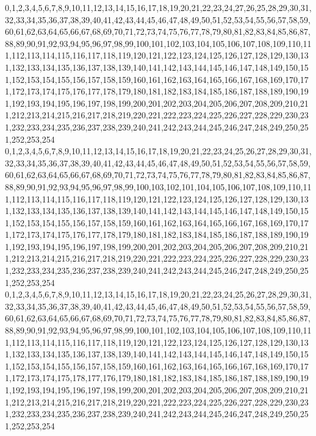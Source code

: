 \documentclass[12pt]{article}
\begin{document}
{0,1,2,3,4,5,6,7,8,9,10,11,12,13,14,15,16,17,18,19,20,21,22,23,24,27,26,25,28,29,30,31,32,33,34,35,36,37,38,39,40,41,42,43,44,45,46,47,48,49,50,51,52,53,54,55,56,57,58,59,60,61,62,63,64,65,66,67,68,69,70,71,72,73,74,75,76,77,78,79,80,81,82,83,84,85,86,87,88,89,90,91,92,93,94,95,96,97,98,99,100,101,102,103,104,105,106,107,108,109,110,111,112,113,114,115,116,117,118,119,120,121,122,123,124,125,126,127,128,129,130,131,132,133,134,135,136,137,138,139,140,141,142,143,144,145,146,147,148,149,150,151,152,153,154,155,156,157,158,159,160,161,162,163,164,165,166,167,168,169,170,171,172,173,174,175,176,177,178,179,180,181,182,183,184,185,186,187,188,189,190,191,192,193,194,195,196,197,198,199,200,201,202,203,204,205,206,207,208,209,210,211,212,213,214,215,216,217,218,219,220,221,222,223,224,225,226,227,228,229,230,231,232,233,234,235,236,237,238,239,240,241,242,243,244,245,246,247,248,249,250,251,252,253,254\\
0,1,2,3,4,5,6,7,8,9,10,11,12,13,14,15,16,17,18,19,20,21,22,23,24,25,26,27,28,29,30,31,32,33,34,35,36,37,38,39,40,41,42,43,44,45,46,47,48,49,50,51,52,53,54,55,56,57,58,59,60,61,62,63,64,65,66,67,68,69,70,71,72,73,74,75,76,77,78,79,80,81,82,83,84,85,86,87,88,89,90,91,92,93,94,95,96,97,98,99,100,103,102,101,104,105,106,107,108,109,110,111,112,113,114,115,116,117,118,119,120,121,122,123,124,125,126,127,128,129,130,131,132,133,134,135,136,137,138,139,140,141,142,143,144,145,146,147,148,149,150,151,152,153,154,155,156,157,158,159,160,161,162,163,164,165,166,167,168,169,170,171,172,173,174,175,176,177,178,179,180,181,182,183,184,185,186,187,188,189,190,191,192,193,194,195,196,197,198,199,200,201,202,203,204,205,206,207,208,209,210,211,212,213,214,215,216,217,218,219,220,221,222,223,224,225,226,227,228,229,230,231,232,233,234,235,236,237,238,239,240,241,242,243,244,245,246,247,248,249,250,251,252,253,254\\
0,1,2,3,4,5,6,7,8,9,10,11,12,13,14,15,16,17,18,19,20,21,22,23,24,25,26,27,28,29,30,31,32,33,34,35,36,37,38,39,40,41,42,43,44,45,46,47,48,49,50,51,52,53,54,55,56,57,58,59,60,61,62,63,64,65,66,67,68,69,70,71,72,73,74,75,76,77,78,79,80,81,82,83,84,85,86,87,88,89,90,91,92,93,94,95,96,97,98,99,100,101,102,103,104,105,106,107,108,109,110,111,112,113,114,115,116,117,118,119,120,121,122,123,124,125,126,127,128,129,130,131,132,133,134,135,136,137,138,139,140,141,142,143,144,145,146,147,148,149,150,151,152,153,154,155,156,157,158,159,160,161,162,163,164,165,166,167,168,169,170,171,172,173,174,175,178,177,176,179,180,181,182,183,184,185,186,187,188,189,190,191,192,193,194,195,196,197,198,199,200,201,202,203,204,205,206,207,208,209,210,211,212,213,214,215,216,217,218,219,220,221,222,223,224,225,226,227,228,229,230,231,232,233,234,235,236,237,238,239,240,241,242,243,244,245,246,247,248,249,250,251,252,253,254\\
}
\end{document}
